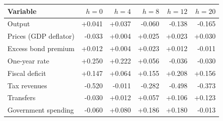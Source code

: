 \begin{tabular}{lrrrrr}
\hline
Variable & $h=0$ & $h=4$ & $h=8$ & $h=12$ & $h=20$ \\
\hline
Output & +0.041 & +0.037 & -0.060 & -0.138 & -0.165 \\
Prices (GDP deflator) & -0.033 & +0.004 & +0.025 & +0.023 & +0.030 \\
Excess bond premium & +0.012 & +0.004 & +0.023 & +0.012 & -0.011 \\
One-year rate & +0.250 & +0.222 & +0.056 & -0.036 & -0.030 \\
Fiscal deficit & +0.147 & +0.064 & +0.155 & +0.208 & +0.156 \\
Tax revenues & -0.520 & -0.011 & -0.282 & -0.498 & -0.373 \\
Transfers & -0.030 & +0.012 & +0.057 & +0.106 & +0.123 \\
Government spending & -0.060 & +0.080 & +0.186 & +0.180 & -0.013 \\
\hline
\end{tabular}
